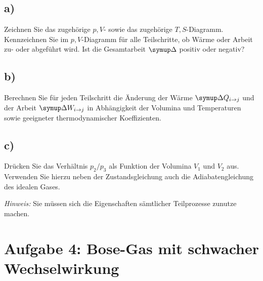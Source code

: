 \subsection{a)}
Zeichnen Sie das zugehörige $p,V$- sowie das zugehörige $T,S$-Diagramm.
Kennzeichnen Sie im $p,V$-Diagramm für alle Teilschritte, ob Wärme oder Arbeit zu- oder abgeführt wird.
Ist die Gesamtarbeit $\symup\Delta$ positiv oder negativ?

\subsection{b)}
Berechnen Sie für jeden Teilschritt die Änderung der Wärme $\symup\Delta Q_{i \to j}$ und der Arbeit $\symup\Delta W_{i \to j}$ in Abhängigkeit der Volumina und Temperaturen sowie geeigneter thermodynamischer Koeffizienten.

\subsection{c)}
Drücken Sie das Verhältnis $p_2 / p_3$ als Funktion der Volumina $V_1$ und $V_2$ aus.
Verwenden Sie hierzu neben der Zustandsgleichung auch die Adiabatengleichung des idealen Gases.

\textit{Hinweis:} Sie müssen sich die Eigenschaften sämtlicher Teilprozesse zunutze machen.

\section{Aufgabe 4: Bose-Gas mit schwacher Wechselwirkung}

